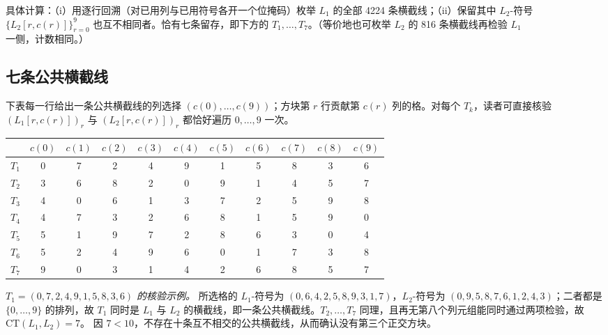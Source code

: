\documentclass[11pt,a4paper]{ctexart}
\theoremstyle{remark}
\newcommand{\CT}{\mathrm{CT}}
\begin{document}
具体计算：（i）用逐行回溯（对已用列与已用符号各开一个位掩码）枚举
$L_1$ 的全部 4224 条横截线；（ii）保留其中 $L_2$-符号
$\{L_2[r,c(r)]\}_{r=0}^{9}$ 也互不相同者。恰有七条留存，即下方的
$T_1,\dots,T_7$。（等价地也可枚举 $L_2$ 的 816 条横截线再检验
$L_1$ 一侧，计数相同。）

\subsection*{七条公共横截线}

下表每一行给出一条公共横截线的列选择 $(c(0),\dots,c(9))$；方块第 $r$
行贡献第 $c(r)$ 列的格。对每个 $T_k$，读者可直接核验
$(L_1[r,c(r)])_r$ 与 $(L_2[r,c(r)])_r$ 都恰好遍历 $0,\dots,9$ 一次。

\begin{center}
\begin{tabular}{c|cccccccccc}
\toprule
 & $c(0)$ & $c(1)$ & $c(2)$ & $c(3)$ & $c(4)$ & $c(5)$ & $c(6)$ & $c(7)$ & $c(8)$ & $c(9)$\\
\midrule
$T_{1}$ & 0 & 7 & 2 & 4 & 9 & 1 & 5 & 8 & 3 & 6 \\
$T_{2}$ & 3 & 6 & 8 & 2 & 0 & 9 & 1 & 4 & 5 & 7 \\
$T_{3}$ & 4 & 0 & 6 & 1 & 3 & 7 & 2 & 5 & 9 & 8 \\
$T_{4}$ & 4 & 7 & 3 & 2 & 6 & 8 & 1 & 5 & 9 & 0 \\
$T_{5}$ & 5 & 1 & 9 & 7 & 2 & 8 & 6 & 3 & 0 & 4 \\
$T_{6}$ & 5 & 2 & 4 & 9 & 6 & 0 & 1 & 7 & 3 & 8 \\
$T_{7}$ & 9 & 0 & 3 & 1 & 4 & 2 & 6 & 8 & 5 & 7 \\
\bottomrule
\end{tabular}
\end{center}

\noindent\emph{$T_1=(0,7,2,4,9,1,5,8,3,6)$ 的核验示例。} 所选格的
$L_1$-符号为 $(0,6,4,2,5,8,9,3,1,7)$，$L_2$-符号为
$(0,9,5,8,7,6,1,2,4,3)$；二者都是 $\{0,\dots,9\}$ 的排列，故 $T_1$
同时是 $L_1$ 与 $L_2$ 的横截线，即一条公共横截线。$T_2,\dots,T_7$
同理，且再无第八个列元组能同时通过两项检验，故 $\CT(L_1,L_2)=7$。
因 $7<10$，不存在十条互不相交的公共横截线，从而确认没有第三个正交方块。
\end{document}
